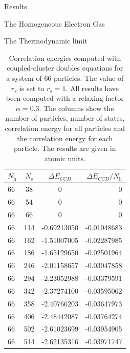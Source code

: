 \documentclass[twoside,english]{uiofysmaster}
\begin{document}
\begin{chapter}{Results}
\begin{section}{The Homogeneous Electron Gas}
\begin{subsection}{The Thermodynamic limit}
			\begin{table}[H]
				\begin{center}
					\begin{tabular}[center]{l  c  c r}
						$N_{\text{h}}$ & $N_{\text{s}}$ & $\Delta E_{CCD}$ & $\Delta E_{CCD}/N_{\text{h}}$ \\
						\hline
						66 &  38 & 0 &0\\
						66 &  54 & 0 &0\\
						66 &  66 & 0 &0\\
						66 & 114 & -0.69213050 & -0.01048683 \\
						66 & 162 & -1.51007005 & -0.02287985 \\
						66 & 186 & -1.65129650 & -0.02501964 \\
						66 & 246 & -2.01158657 & -0.03047858 \\
						66 & 294 & -2.23052988 & -0.03379591 \\
						66 & 342 & -2.37274100 & -0.03595062 \\
						66 & 358 & -2.40766203 & -0.03647973 \\
						66 & 406 & -2.48442087 & -0.03764274 \\
						66 & 502 & -2.61023699 & -0.03954905 \\
						66 & 514 & -2.62135316 & -0.03971747 \\
					\end{tabular}
				\end{center}
				\caption{Correlation energies computed with coupled-cluster doubles equations for a system of $66$ particles. The value of $r_s$ is set to $r_s=1$. All results have been computed with a relaxing factor $\alpha=0.3$. The columns show the number of particles, number of states, correlation energy for all particles and the correlation energy for each particle. The results are given in atomic units.}
				\label{table:ThermodynamicLimit4}
			\end{table}


\end{subsection}
\end{section}
\end{chapter}
\end{document}

